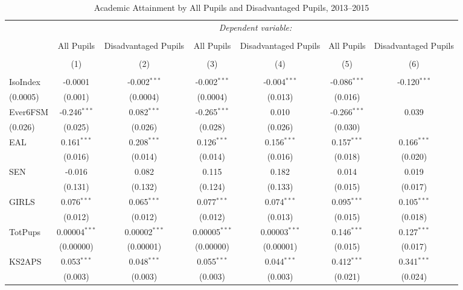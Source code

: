 \documentclass[12pt, a4paper]{article}
\begin{document}
\begin{table} 
\centering 
 \caption{Academic Attainment by All Pupils and Disadvantaged Pupils, 2013--2015} 
 \label{table2} 
\begin{tabular}{@{\extracolsep{5pt}}lcccccc} 
\hline 
 & \multicolumn{6}{c}{\textit{Dependent variable:}} \\ 
\cline{2-7} 
\\[-1.8ex] & All Pupils & Disadvantaged Pupils & All Pupils & Disadvantaged Pupils & All Pupils & Disadvantaged Pupils\\ 
\\[-1.8ex] & (1) & (2) & (3) & (4) & (5) & (6)\\ 
\hline \\[-1.8ex] 
 IsoIndex & -0.0001 & -0.002$^{***}$ & -0.002$^{***}$ & -0.004$^{***}$ & -0.086$^{***}$ & -0.120$^{***}$ \\ 
  (0.0005) & (0.001) & (0.0004) & (0.0004)& (0.013) & (0.016) \\ 
 Ever6FSM & -0.246$^{***}$ & 0.082$^{***}$ & -0.265$^{***}$ & 0.010 & -0.266$^{***}$ & 0.039 \\
  (0.026) & (0.025) & (0.026) & (0.028) & (0.026) & (0.030) \\ 
 EAL & 0.161$^{***}$ & 0.208$^{***}$ & 0.126$^{***}$ & 0.156$^{***}$ & 0.157$^{***}$ & 0.166$^{***}$ \\ 
 & (0.016) & (0.014) & (0.014) & (0.016) & (0.018) & (0.020) \\ 
 SEN & -0.016 & 0.082 & 0.115 & 0.182 & 0.014 & 0.019 \\ 
 & (0.131) & (0.132) & (0.124) & (0.133) & (0.015) & (0.017) \\ 
 GIRLS & 0.076$^{***}$ & 0.065$^{***}$ & 0.077$^{***}$ & 0.074$^{***}$ & 0.095$^{***}$ & 0.105$^{***}$ \\
 & (0.012) & (0.012) & (0.012) & (0.013) & (0.015) & (0.018) \\ 
 TotPups & 0.00004$^{***}$ & 0.00002$^{***}$ & 0.00005$^{***}$ & 0.00003$^{***}$ & 0.146$^{***}$ & 0.127$^{***}$ \\ 
 & (0.00000) & (0.00001) & (0.00000) & (0.00001) & (0.015) & (0.017) \\ 
 KS2APS & 0.053$^{***}$ & 0.048$^{***}$ & 0.055$^{***}$ & 0.044$^{***}$ & 0.412$^{***}$ & 0.341$^{***}$ \\ 
 & (0.003) & (0.003) & (0.003) & (0.003) & (0.021) & (0.024) \\ 

\end{tabular}
\end{table}
\end{document}
